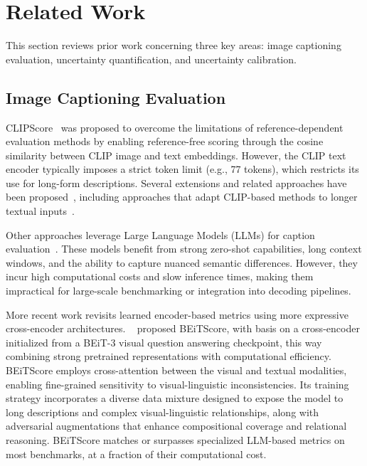 \documentclass[11pt]{article}
\begin{document}
\vspace{-0.13cm}
\section{Related Work}
\vspace{-0.13cm}

This section reviews prior work concerning three key areas: image captioning evaluation, uncertainty quantification, and uncertainty calibration.

\vspace{-0.13cm}
\subsection{Image Captioning Evaluation}
\vspace{-0.13cm}

CLIPScore~\cite{hessel2021clipscore} was proposed to overcome the limitations of reference-dependent evaluation methods by enabling reference-free scoring through the cosine similarity between CLIP image and text embeddings. However, the CLIP text encoder typically imposes a strict token limit (e.g., 77 tokens), which restricts its use for long-form descriptions. Several extensions and related approaches have been proposed~\cite{sarto2025positive,hu2023infometic,narins2023validated,wada2024polos,gomes2025evaluation}, including approaches that adapt CLIP-based methods to longer textual inputs~\cite{chen2025specs,zhang2024long}.

Other approaches leverage Large Language Models (LLMs) for caption evaluation~\cite{chan2023clair, lee2024fleur, kim2025expert}. These models benefit from strong zero-shot capabilities, long context windows, and the ability to capture nuanced semantic differences. However, they incur high computational costs and slow inference times, making them impractical for large-scale benchmarking or integration into decoding pipelines.

More recent work revisits learned encoder-based metrics using more expressive cross-encoder architectures. ~\citet{beitscore} proposed BEiTScore, with basis on a cross-encoder initialized from a BEiT-3 visual question answering checkpoint, this way combining strong pretrained representations with computational efficiency. BEiTScore employs cross-attention between the visual and textual modalities, enabling fine-grained sensitivity to visual-linguistic inconsistencies. Its training strategy incorporates a diverse data mixture designed to expose the model to long descriptions and complex visual-linguistic relationships, along with adversarial augmentations that enhance compositional coverage and relational reasoning. BEiTScore matches or surpasses specialized LLM-based metrics on most benchmarks, at a fraction of their computational cost.
\end{document}
